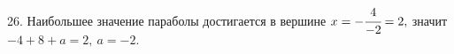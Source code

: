 26. Наибольшее значение параболы достигается в вершине $x=-\cfrac{4}{-2}=2,$ значит $-4+8+a=2,\ a=-2.$\\
